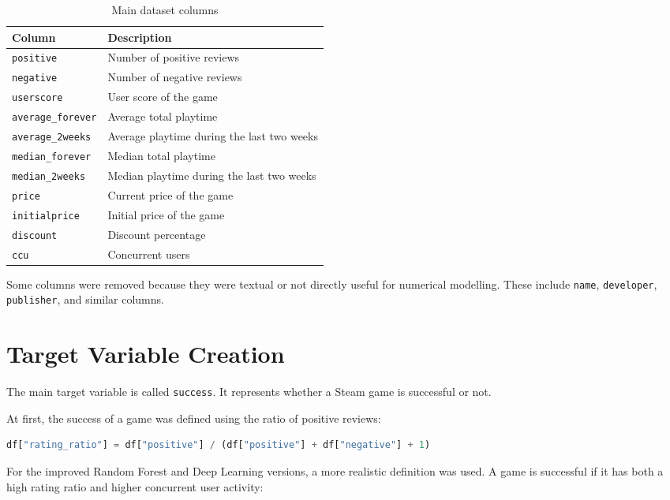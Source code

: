 \documentclass[12pt,a4paper]{article}
\begin{document}
\begin{table}[H]
\centering
\begin{tabular}{p{4cm} p{10cm}}
\toprule
\textbf{Column} & \textbf{Description} \\
\midrule
\texttt{positive} & Number of positive reviews \\
\texttt{negative} & Number of negative reviews \\
\texttt{userscore} & User score of the game \\
\texttt{average\_forever} & Average total playtime \\
\texttt{average\_2weeks} & Average playtime during the last two weeks \\
\texttt{median\_forever} & Median total playtime \\
\texttt{median\_2weeks} & Median playtime during the last two weeks \\
\texttt{price} & Current price of the game \\
\texttt{initialprice} & Initial price of the game \\
\texttt{discount} & Discount percentage \\
\texttt{ccu} & Concurrent users \\
\bottomrule
\end{tabular}
\caption{Main dataset columns}
\end{table}

Some columns were removed because they were textual or not directly useful for numerical modelling. These include \texttt{name}, \texttt{developer}, \texttt{publisher}, and similar columns.

\section{Target Variable Creation}

The main target variable is called \texttt{success}. It represents whether a Steam game is successful or not.

At first, the success of a game was defined using the ratio of positive reviews:

\begin{lstlisting}[language=Python]
df["rating_ratio"] = df["positive"] / (df["positive"] + df["negative"] + 1)
\end{lstlisting}

For the improved Random Forest and Deep Learning versions, a more realistic definition was used. A game is successful if it has both a high rating ratio and higher concurrent user activity:
\end{document}
